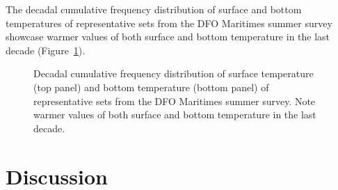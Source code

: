 \documentclass[12pt]{article}\usepackage[]{graphicx}\usepackage[]{color}
\begin{document}
The decadal cumulative frequency distribution of surface and bottom temperatures of representative sets from the DFO Maritimes summer survey showcase warmer values of both surface and bottom temperature in the last decade (Figure~\ref{fig:setsdistdecadal}).


\begin{figure}[htb]

{\centering {} 

}

\caption{Decadal cumulative frequency distribution of surface temperature (top panel) and bottom temperature (bottom panel) of representative sets from the DFO Maritimes summer survey. Note warmer values of both surface and bottom temperature in the last decade.}\label{fig:setsdistdecadal}
\end{figure}
\hypertarget{discussion}{%
\section{Discussion}\label{discussion}}
\end{document}
